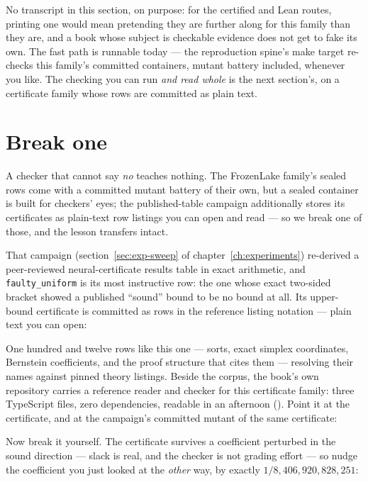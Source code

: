 \noindent No transcript in this section, on purpose: for the
certified and Lean routes, printing one would mean pretending they
are further along for this family than they are, and a book whose
subject is checkable evidence does not get to fake its own. The fast
path is runnable today --- the reproduction spine's make target
re-checks this family's committed containers, mutant battery
included, whenever you like. The checking you can run \emph{and read
whole} is the next section's, on a certificate family whose rows are
committed as plain text.

\section{Break one}
\label{sec:qs-break}

A checker that cannot say \emph{no} teaches nothing. The FrozenLake
family's sealed rows come with a committed mutant battery of their
own, but a sealed container is built for checkers' eyes; the
published-table campaign additionally stores its certificates as
plain-text row listings you can open and read --- so we break one of
those, and the lesson transfers intact.

That campaign (section~\ref{sec:exp-sweep} of
chapter~\ref{ch:experiments}) re-derived a peer-reviewed
neural-certificate results table in exact arithmetic, and
\texttt{faulty\_uniform} is its most instructive row: the one whose
exact two-sided bracket showed a published ``sound'' bound to be no
bound at all. Its upper-bound certificate is committed as rows in the
reference listing notation --- plain text you can open:



\noindent One hundred and twelve rows like this one --- sorts, exact
simplex coordinates, Bernstein coefficients, and the proof structure
that cites them --- resolving their names against pinned theory
listings. Beside the corpus, the book's own repository carries a
reference reader and checker for this certificate family: three
TypeScript files, zero dependencies, readable in an afternoon
(). Point it at the certificate,
and at the campaign's committed mutant of the same certificate:



\noindent Now break it yourself. The certificate survives a
coefficient perturbed in the sound direction --- slack is real, and
the checker is not grading effort --- so nudge the coefficient you
just looked at the \emph{other} way, by exactly
$1/8{,}406{,}920{,}828{,}251$:

